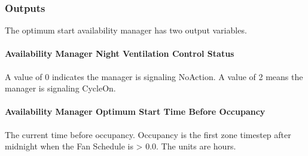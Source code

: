 \subsubsection{Outputs}\label{outputs-10-007}

The optimum start availability manager has two output variables.

\paragraph{Availability Manager Night Ventilation Control Status}\label{availability-manager-night-ventilation-control-status-1}

A value of 0 indicates the manager is signaling NoAction. A value of 2 means the manager is signaling CycleOn.

\paragraph{Availability Manager Optimum Start Time Before Occupancy}\label{availability-manager-optimum-start-time-before-occupancy}

The current time before occupancy. Occupancy is the first zone timestep after midnight when the Fan Schedule is \textgreater{} 0.0. The units are hours.
